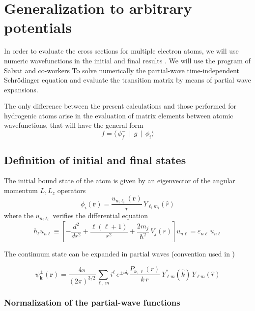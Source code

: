 \chapter{Generalization to arbitrary potentials}

In order to evaluate the cross sections for multiple electron atoms, we
will use numeric wavefunctions in the initial and final results
\parencite{Madison1973PRAp2449,Gulyas1995JPBp245,Fiori2001PRAp12705}. We will use the program of
Salvat and co-workers \parencite{Salvat1995CPCp151} To solve numerically the
partial-wave time-independent Schr\"{o}dinger equation and evaluate the
transition matrix by means of partial wave expansions.

The only difference between the present calculations and those
performed for hydrogenic atoms arise in the evaluation of matrix
elements between atomic wavefunctions, that will have the general form
\[
f = \langle \, \phi_{f}^{-} \, \mid  \, g \, \mid \, \phi_{i} \rangle
\]

\section{Definition of initial and final states}

The initial bound state of the atom is given by an eigenvector of the
angular momentum $L,L_{z}$ operators
%
\begin{equation}\label{Q:ap1}
\phi_{i}(\bm{r}) = \frac{u_{n_{i} \ell_{i}} (\bm{r})}{r} \, Y_{\ell_{i}
m_{i}}(\hat{r})
\end{equation}
%
where the $u_{n_{i} \ell_{i}}$ verifies the differential equation
\[
h_{\ell} u_{n \ell} \equiv \left[ - \frac{d^{2}}{d r^{2}} +
\frac{\ell (\ell + 1 )}{r^{2}} + \frac{2 m_{j}}{\hbar^{2}}\, V_{j}(r)
\right] u_{n \ell} = \varepsilon_{n \ell} \, u_{n \ell}
\]

The continuum state can be expanded in partial waves (convention used
in \cite{Salvat1995CPCp151})

\begin{equation}\label{Q:ap2}
\psi^{\pm}_{\bm{k}}(\bm{r}) = \frac{4 \pi}{(2 \pi)^{3/2}}\sum_{\ell,\, m}
i^{\ell} \, e^{\pm i \delta_{\ell}} \frac{P_{k,\,
\ell}(r)}{k\,r}\ Y^{*}_{\ell m}(\hat{k})\, Y_{\ell m}(\hat{r})
\end{equation}

\subsection{Normalization of the partial-wave functions}

